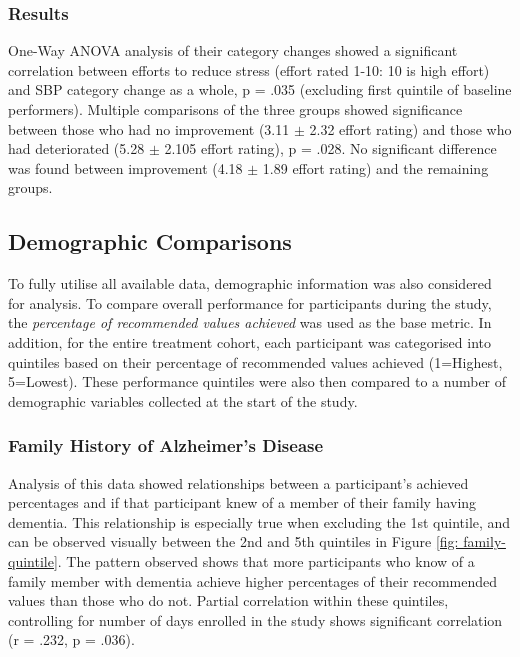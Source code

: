 \subsubsection{Results}
One-Way ANOVA analysis of their category changes showed a significant correlation between efforts to reduce stress (effort rated 1-10: 10 is high effort) and SBP category change as a whole, p = .035 (excluding first quintile of baseline performers). Multiple comparisons of the three groups showed significance between those who had no improvement (3.11 $\pm$ 2.32 effort rating) and those who had deteriorated (5.28 $\pm$ 2.105 effort rating), p = .028. No significant difference was found between improvement (4.18 $\pm$ 1.89 effort rating) and the remaining groups.

\subsection{Demographic Comparisons}
To fully utilise all available data, demographic information was also considered for analysis. To compare overall performance for participants during the study, the \textit{percentage of recommended values achieved} was used as the base metric. In addition, for the entire treatment cohort, each participant was categorised into quintiles based on their percentage of recommended values achieved (1=Highest, 5=Lowest). These performance quintiles were also then compared to a number of demographic variables collected at the start of the study.

\subsubsection{Family History of Alzheimer's Disease}
Analysis of this data showed relationships between a participant’s achieved percentages and if that participant knew of a member of their family having dementia. This relationship is especially true when excluding the 1st quintile, and can be observed visually between the 2nd and 5th quintiles in Figure \ref{fig: family-quintile}. The pattern observed shows that more participants who know of a family member with dementia achieve higher percentages of their recommended values than those who do not. Partial correlation within these quintiles, controlling for number of days enrolled in the study shows significant correlation (r = .232, p = .036).

